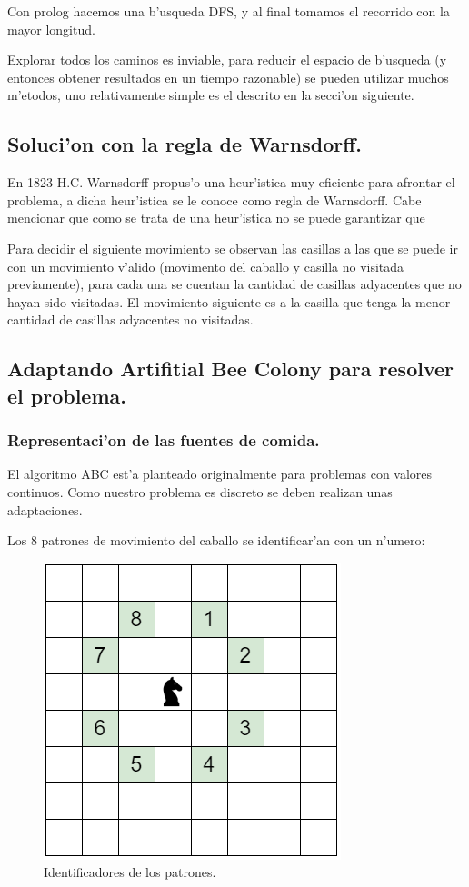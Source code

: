 \documentclass[12pt]{article}
\begin{document}
    Con prolog hacemos una b'usqueda DFS, y al final tomamos
    el recorrido con la mayor longitud.

    Explorar todos los caminos es inviable, para reducir el espacio
    de b'usqueda (y entonces obtener resultados en un tiempo razonable)
    se pueden utilizar muchos m'etodos, uno relativamente
    simple es el descrito en la secci'on siguiente.



    \subsection{Soluci'on con la regla de Warnsdorff.}
    En 1823  H.C. Warnsdorff propus'o una heur'istica muy eficiente para afrontar el problema, a dicha heur'istica se le conoce
    como regla de Warnsdorff. Cabe mencionar que como se trata de una heur'istica no se puede garantizar que

    Para decidir el siguiente movimiento
    se observan las casillas a las que se puede ir con un movimiento v'alido (movimento del caballo y casilla no visitada previamente),
    para cada una se cuentan la cantidad de casillas adyacentes que no hayan sido visitadas.
    El movimiento siguiente es a la casilla que tenga la menor cantidad de casillas adyacentes no visitadas.


    \subsection{Adaptando Artifitial Bee Colony para resolver el problema.}

    \subsubsection{Representaci'on de las fuentes de comida.}

    El algoritmo ABC est'a planteado originalmente para problemas con valores continuos. Como nuestro problema es discreto
    se deben realizan unas adaptaciones.


    Los 8 patrones de movimiento del caballo se identificar'an con un n'umero:
    \begin{figure}[H]
        \centering
        \includegraphics[scale=0.5]{id_move.png}
        \caption{Identificadores de los patrones.}
        \label{fig:id_move}
    \end{figure}
\end{document}
